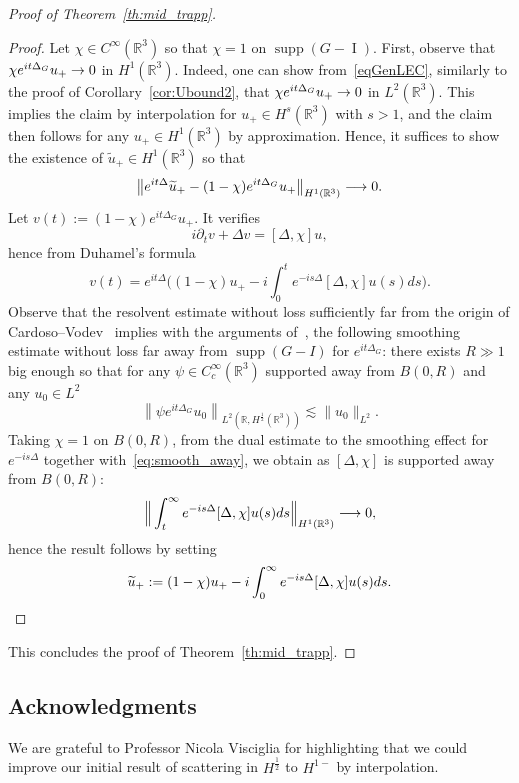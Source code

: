 \documentclass[AHL,Unicode,longabstracts,published]{cedram}
\newcommand*\R{\mathbb{R}}
\DeclareMathOperator{\I}{I}
\DeclareMathOperator{\supp}{supp}
\renewcommand*{\to}{\mathchoice{\longrightarrow}{\rightarrow}{\rightarrow}{\rightarrow}}
\begin{document}
\begin{proof}[Proof of Theorem~\ref{th:mid_trapp}]
\begin{proof}
Let $\chi \in C^\infty(\R^3)$ so that $\chi = 1$ on $\supp(G - \I)$. First, observe that $\chi e^{it\Delta_G} u_+ \to 0$ in $H^1(\R^3)$. Indeed, one can show from~\eqref{eqGenLEC}, similarly to the proof of Corollary~\ref{cor:Ubound2}, that $\chi e^{it\Delta_G} u_+ \to 0$ in $L^2(\R^3)$. This implies the claim by interpolation for $u_+ \in H^s(\R^3)$ with $s>1$, and the claim then follows for any $u_+\in H^1(\R ^3)$ by approximation. Hence, it suffices to show the existence of $\widetilde u_+ \in H^1(\R^3)$ so that
\[
\left\| e^{it\Delta}\widetilde u_+ - (1-\chi)e^{it\Delta_G} u_+ \right\|_{H^1(\R^3)} \to 0.
\]
Let $v(t) := (1-\chi)e^{it\Delta_G} u_+$. It verifies
\[
i\partial_t v + \Delta v = [\Delta, \chi] u,
\]
hence from Duhamel's formula
\[
v(t) = e^{it\Delta}\Big((1-\chi) u_+ - i\int_0^t e^{-is\Delta} [\Delta, \chi] u(s) ds \Big).
\]
Observe that the resolvent estimate without loss sufficiently far from the origin of Cardoso--Vodev~\cite{CaVo02} implies with the arguments of~\cite[Proposition~2.7]{BuGeTz04b}, the following smoothing estimate without loss far away from $\supp(G-I)$ for $e^{it\Delta_G}$: there exists $R\gg 1$ big enough so that for any $\psi \in C^\infty_c(\R^3)$ supported away from $B(0, R)$ and any $u_0 \in L^2$
\begin{equation}\label{eq:smooth_away}
\left\| \psi e^{it\Delta_G} u_0\right\|_{L^2\left(\R, H^{\frac 12}(\R ^3)\right)}
\lesssim \| u_0 \|_{L^2}.
\end{equation}
Taking $\chi =1$ on $B(0,R)$, from the dual estimate to the smoothing effect for $e^{-is\Delta}$ together with~\eqref{eq:smooth_away}, we obtain as $[\Delta, \chi]$ is supported away from $B(0,R)$:
\[
\Big\| \int_t^\infty e^{-is\Delta} [\Delta, \chi] u(s) ds \Big\|_{H^1(\R^3) }\to 0,
\]
hence the result follows by setting
\[
\widetilde u_+ := (1-\chi) u_+ - i\int_0^\infty e^{-is\Delta} [\Delta, \chi] u(s) ds.\qedhere
\]
\end{proof}

This concludes the proof of Theorem~\ref{th:mid_trapp}.
\end{proof}
\subsection*{Acknowledgments} We are grateful to Professor Nicola Visciglia for highlighting that we could improve our initial result of scattering in $H^{\frac 12}$ to $H^{1-}$ by interpolation.



\end{document}
